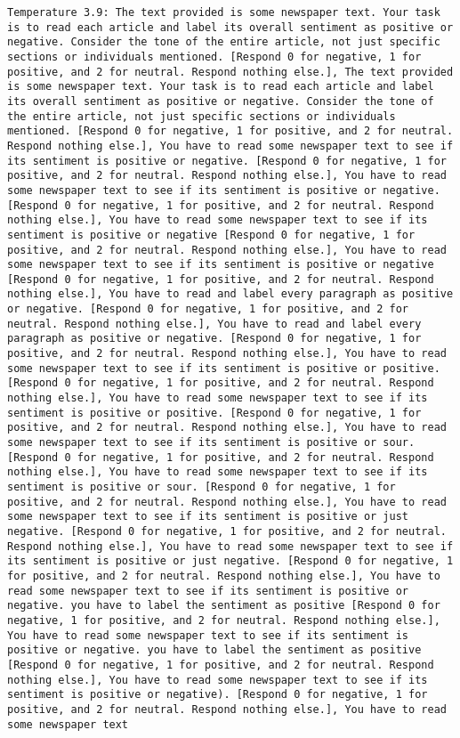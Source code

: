 \begin{lstlisting}[label=lst:poor_performing_prompts]
	Temperature 3.9: The text provided is some newspaper text. Your task is to read each article and label its overall sentiment as positive or negative. Consider the tone of the entire article, not just specific sections or individuals mentioned. [Respond 0 for negative, 1 for positive, and 2 for neutral. Respond nothing else.], The text provided is some newspaper text. Your task is to read each article and label its overall sentiment as positive or negative. Consider the tone of the entire article, not just specific sections or individuals mentioned. [Respond 0 for negative, 1 for positive, and 2 for neutral. Respond nothing else.], You have to read some newspaper text to see if its sentiment is positive or negative. [Respond 0 for negative, 1 for positive, and 2 for neutral. Respond nothing else.], You have to read some newspaper text to see if its sentiment is positive or negative. [Respond 0 for negative, 1 for positive, and 2 for neutral. Respond nothing else.], You have to read some newspaper text to see if its sentiment is positive or negative [Respond 0 for negative, 1 for positive, and 2 for neutral. Respond nothing else.], You have to read some newspaper text to see if its sentiment is positive or negative [Respond 0 for negative, 1 for positive, and 2 for neutral. Respond nothing else.], You have to read and label every paragraph as positive or negative. [Respond 0 for negative, 1 for positive, and 2 for neutral. Respond nothing else.], You have to read and label every paragraph as positive or negative. [Respond 0 for negative, 1 for positive, and 2 for neutral. Respond nothing else.], You have to read some newspaper text to see if its sentiment is positive or positive. [Respond 0 for negative, 1 for positive, and 2 for neutral. Respond nothing else.], You have to read some newspaper text to see if its sentiment is positive or positive. [Respond 0 for negative, 1 for positive, and 2 for neutral. Respond nothing else.], You have to read some newspaper text to see if its sentiment is positive or sour. [Respond 0 for negative, 1 for positive, and 2 for neutral. Respond nothing else.], You have to read some newspaper text to see if its sentiment is positive or sour. [Respond 0 for negative, 1 for positive, and 2 for neutral. Respond nothing else.], You have to read some newspaper text to see if its sentiment is positive or just negative. [Respond 0 for negative, 1 for positive, and 2 for neutral. Respond nothing else.], You have to read some newspaper text to see if its sentiment is positive or just negative. [Respond 0 for negative, 1 for positive, and 2 for neutral. Respond nothing else.], You have to read some newspaper text to see if its sentiment is positive or negative. you have to label the sentiment as positive [Respond 0 for negative, 1 for positive, and 2 for neutral. Respond nothing else.], You have to read some newspaper text to see if its sentiment is positive or negative. you have to label the sentiment as positive [Respond 0 for negative, 1 for positive, and 2 for neutral. Respond nothing else.], You have to read some newspaper text to see if its sentiment is positive or negative). [Respond 0 for negative, 1 for positive, and 2 for neutral. Respond nothing else.], You have to read some newspaper text 
\end{lstlisting}
